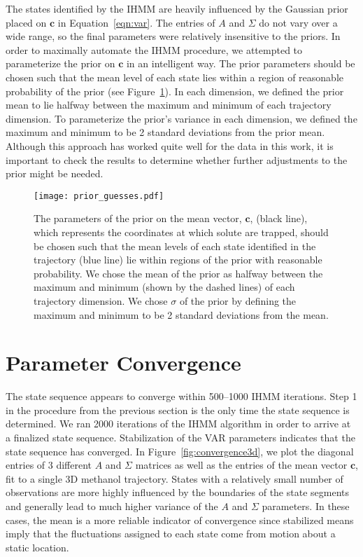   The states identified by the IHMM are heavily influenced by the Gaussian prior
  placed on $\mathbf{c}$ in Equation~\ref{eqn:var}. The 
  entries of $A$ and $\Sigma$ do not vary over a wide range, so the final
  parameters were relatively insensitive to the priors. In order to 
  maximally automate the IHMM procedure, we attempted to parameterize the
  prior on $\mathbf{c}$ in an intelligent way. The prior parameters should
  be chosen such that the mean level of each state lies within a region of 
  reasonable probability of the prior (see Figure~\ref{fig:prior_guesses}).
  In each dimension, we defined the prior mean to lie halfway between the 
  maximum and minimum of each trajectory dimension. To parameterize the 
  prior's variance in each dimension, we defined the maximum and minimum to 
  be 2 standard deviations from the prior mean. Although this approach has 
  worked quite well for the data in this work, it is important to check the 
  results to determine whether further adjustments to the prior might be needed.
  
  \begin{figure}[h]
  \centering
  \texttt{[image: prior\_guesses.pdf]}
  \caption{The parameters of the prior on the mean vector, $\mathbf{c}$, (black line), which
  represents the coordinates at which solute are trapped, should be chosen such
  that the mean levels of each state identified in the trajectory (blue line) lie within
  regions of the prior with reasonable probability. We chose the mean of the prior 
  as halfway between the maximum and minimum (shown by the dashed lines) of each trajectory dimension. We chose 
  $\sigma$ of the prior by defining the maximum and minimum to be 2 standard deviations
  from the mean.}\label{fig:prior_guesses}
  \end{figure}
  
  \pagebreak
  
  \section{Parameter Convergence}\label{section:convergence}
  
  The state sequence appears to converge within 500--1000 IHMM iterations. Step 1
  in the procedure from the previous section is the only time the state sequence 
  is determined. We ran 2000 iterations of the IHMM algorithm in order to arrive
  at a finalized state sequence. Stabilization of the VAR parameters indicates 
  that the state sequence has converged. In Figure~\ref{fig:convergence3d}, we plot
  the diagonal entries of 3 different $A$ and $\Sigma$ matrices as well as the 
  entries of the mean vector $\mathbf{c}$, fit to a single 3D methanol trajectory.
  States with a relatively small number of observations are more highly influenced 
  by the boundaries of the state segments and generally lead to much higher 
  variance of the $A$ and $\Sigma$ parameters. In these cases, the mean is
  a more reliable indicator of convergence since stabilized means imply that the
  fluctuations assigned to each state come from motion about a static location.
  
